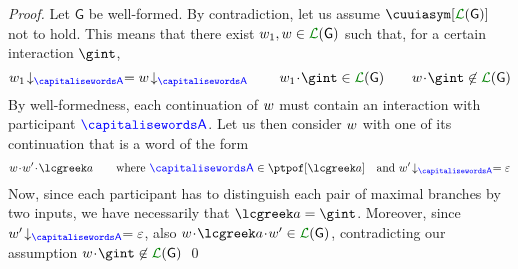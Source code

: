 \begin{proof}
Let ${\mathsf G}$ be well-formed.
By contradiction, let us assume $\cuuiasym[{\clang({\mathsf G})}]$ not to hold.
This means that there exist $\acword_1,\acword\in\clang({\mathsf G})$ such that, for a certain
interaction $\gint$,
$$
\proj{\acword_1}{A} = \proj{\acword}{A}      \qquad      \acword_1\cat\gint\in\clang({\mathsf G})   
\qquad \acword\cat\gint\not\in\clang({\mathsf G})
$$
By well-formedness, each continuation of $w$ must contain an interaction with participant $\p$.
Let us then consider $w$ with one of its  continuation that is a word of the form
$$
\acword\cat\acword'\cat \aint \qquad \text{where } \p\in\ptpof[\aint] \quad \text{and }\proj{\acword'}{A}=\emptyword
$$
Now, since each participant has to distinguish each pair of maximal branches by two inputs,
we have necessarily that $\aint=\gint$. Moreover, since  $\proj{\acword'}{A}=\emptyword$,
also $\acword\cat \aint\cat\acword'\in\clang({\mathsf G}) $, contradicting our assumption
$\acword\cat\gint\not\in\clang({\mathsf G})$
\qed
\end{proof}




